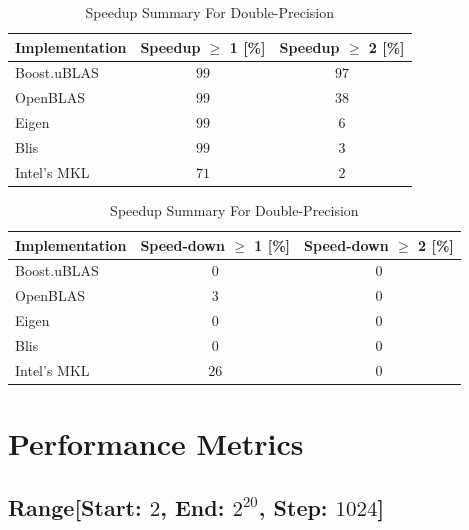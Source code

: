 \begin{table}[ht]
    \centering
    \caption{Speedup Summary For Double-Precision}
    \begin{tabular}{|l|c|c|}
        \hline
        \textbf{Implementation} & \textbf{Speedup $\geq$ 1 [\%]} & \textbf{Speedup $\geq$ 2 [\%]}\\
        \hline
        Boost.uBLAS & $99$ & $97$ \\
        \hline
        OpenBLAS    & $99$ & $38$ \\
        \hline
        Eigen       & $99$ & $6$ \\
        \hline
        Blis        & $99$ & $3$ \\
        \hline
        Intel's MKL & $71$ & $2$ \\
        \hline
    \end{tabular}

    \begin{tabular}{|l|c|c|}
        \hline
        \textbf{Implementation} & \textbf{Speed-down $\geq$ 1 [\%]} & \textbf{Speed-down $\geq$ 2 [\%]}\\
        \hline
        Boost.uBLAS & $0$ & $0$ \\
        \hline
        OpenBLAS    & $3$ & $0$ \\
        \hline
        Eigen       & $0$ & $0$ \\
        \hline
        Blis        & $0$ & $0$ \\
        \hline
        Intel's MKL & $26$ & $0$ \\
        \hline
    \end{tabular}
\end{table}

\clearpage
\section{Performance Metrics}

\subsection*{Range[Start: $2$, End: $2^{20}$, Step: $1024$]}

